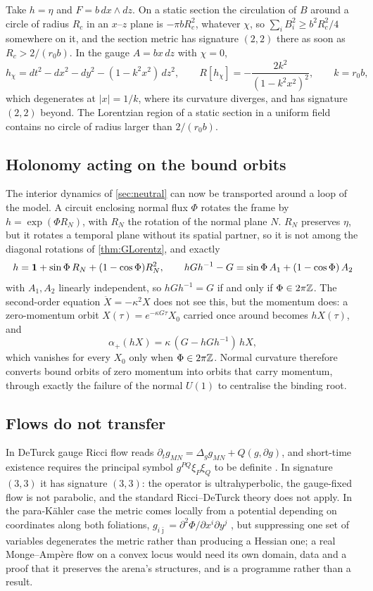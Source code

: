 \begin{example}
\label{ex:landau}
Take $h=\eta$ and $F=b\,dx\wedge dz$. On a static section the circulation of $B$ around a circle of radius $R_c$ in an $x$--$z$ plane is $-\pi bR_c^2$, whatever $\chi$,
so $\sum_iB_i^2\ge b^2R_c^2/4$ somewhere on it, and the section metric has signature $(2,2)$ there as soon as $R_c>2/(r_0b)$. In the gauge $A=bx\,dz$ with $\chi=0$,
\[
h_\chi=dt^2-dx^2-dy^2-(1-k^2x^2)\,dz^2,\qquad R[h_\chi]=-\frac{2k^2}{(1-k^2x^2)^2},\qquad k=r_0b,
\]
which degenerates at $|x|=1/k$, where its curvature diverges, and has signature $(2,2)$ beyond. The Lorentzian region of a static section in a uniform field
contains no circle of radius larger than $2/(r_0b)$.
\end{example}

\subsection{Holonomy acting on the bound orbits}

The interior dynamics of \cref{sec:neutral} can now be transported around a loop of the model. A circuit enclosing normal flux $\Phi$ rotates the frame by
$h=\exp(\Phi R_N)$, with $R_N$ the rotation of the normal plane $N$. $R_N$ preserves $\eta$, but it rotates a temporal plane without its spatial partner, so it is not
among the diagonal rotations of \cref{thm:GLorentz}, and exactly
\[
h=\mathbf 1+\sin\Phi\,R_N+(1-\cos\Phi)R_N^2,\qquad hGh^{-1}-G=\sin\Phi\,A_1+(1-\cos\Phi)\,A_2
\]
with $A_1,A_2$ linearly independent, so $hGh^{-1}=G$ if and only if $\Phi\in2\pi\mathbb{Z}$. The second-order equation $\ddot X=-\kappa^2X$ does not see this, but the momentum
does: a zero-momentum orbit $X(\tau)=e^{-\kappa G\tau}X_0$ carried once around becomes $hX(\tau)$, and
\[
\alpha_+(hX)=\kappa\,(G-hGh^{-1})\,hX ,
\]
which vanishes for every $X_0$ only when $\Phi\in2\pi\mathbb{Z}$. Normal curvature therefore converts bound orbits of zero momentum into orbits that carry momentum, through
exactly the failure of the normal $U(1)$ to centralise the binding root.

\subsection{Flows do not transfer}

In DeTurck gauge Ricci flow reads $\partial_tg_{MN}=\Delta_gg_{MN}+Q(g,\partial g)$, and short-time existence requires the principal symbol $g^{PQ}\xi_P\xi_Q$ to be
definite \cite{Hamilton82,DeTurck83}. In signature $(3,3)$ it has signature $(3,3)$: the operator is ultrahyperbolic, the gauge-fixed flow is not parabolic, and the
standard Ricci--DeTurck theory does not apply. In the para-K\"ahler case the metric comes locally from a potential depending on coordinates along both
foliations, $g_{i\bar\jmath}=\partial^2\Phi/\partial x^i\partial y^j$ \cite{Shima07}, but suppressing one set of variables degenerates the metric rather than producing a Hessian
one; a real Monge--Amp\`ere flow on a convex locus \cite{Cao85} would need its own domain, data and a proof that it preserves the arena's structures, and is a
programme rather than a result.

